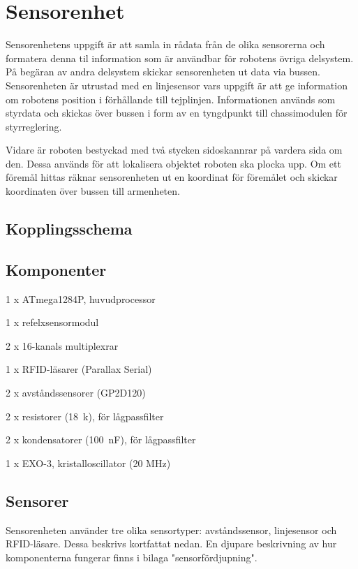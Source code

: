 \section{Sensorenhet}
Sensorenhetens uppgift är att samla in rådata från de olika sensorerna och formatera denna til information som är användbar för robotens övriga delsystem. På begäran av andra delsystem skickar sensorenheten ut data via bussen. Sensorenheten är utrustad
med en linjesensor vars uppgift är att ge information om robotens position i förhållande till tejplinjen. Informationen används som styrdata och skickas över bussen i form av en tyngdpunkt till chassimodulen för styrreglering.

Vidare är roboten bestyckad med två stycken sidoskannrar på vardera sida om den. Dessa används för att lokalisera objektet roboten ska plocka upp. Om ett föremål hittas räknar sensorenheten ut en koordinat för föremålet och skickar koordinaten över bussen till armenheten.

\subsection{Kopplingsschema}

\subsection{Komponenter}
\begin{packed_itemize}
\item 1 x ATmega1284P, huvudprocessor
\item 1 x refelxsensormodul
\item 2 x 16-kanals multiplexrar
\item 1 x RFID-läsarer (Parallax Serial)
\item 2 x avståndssensorer (GP2D120)
\item 2 x resistorer (18~k\ohm), för lågpassfilter
\item 2 x kondensatorer (100~nF), för lågpassfilter
\item 1 x EXO-3, kristalloscillator (20 MHz)
\end{packed_itemize}

\subsection{Sensorer}
Sensorenheten använder tre olika sensortyper: avståndssensor, linjesensor och RFID-läsare.
Dessa beskrivs kortfattat nedan. En djupare beskrivning av hur komponenterna fungerar finns i bilaga "sensorfördjupning".

